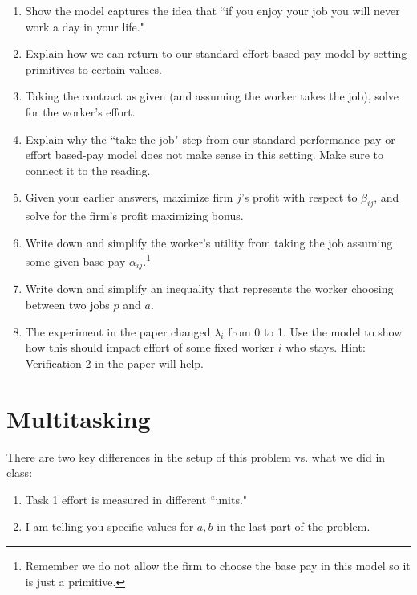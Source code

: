 \documentclass{article}
\begin{document}
\begin{enumerate}
    \item Show the model captures the idea that ``if you enjoy your job you will never work a day in your life."

    \item Explain how we can return to our standard effort-based pay model by setting primitives to certain values.

    \item Taking the contract as given (and assuming the worker takes the job), solve for the worker's effort.

    \item Explain why the ``take the job" step from our standard performance pay or effort based-pay model does not make sense in this setting. Make sure to connect it to the reading.

    \item Given your earlier answers, maximize firm $j$'s profit with respect to $\beta_{ij}$, and solve for the firm's profit maximizing bonus.

    \item Write down and simplify the worker's utility from taking the job assuming some given base pay $\alpha_{ij}$.\footnote{Remember we do not allow the firm to choose the base pay in this model so it is just a primitive.}

    \item Write down and simplify an inequality that represents the worker choosing between two jobs $p$ and $a$.

    \item The experiment in the paper changed $\lambda_i$ from 0 to 1. Use the model to show how this should impact effort of some fixed worker $i$ who stays. Hint: Verification 2 in the paper will help.


    
\end{enumerate}


\section{Multitasking}
There are two key differences in the setup of this problem vs. what we did in class:

\begin{enumerate}
    \item Task 1 effort is measured in different ``units."
    \item I am telling you specific values for $a,b$ in the last part of the problem.
\end{enumerate}
\end{document}
